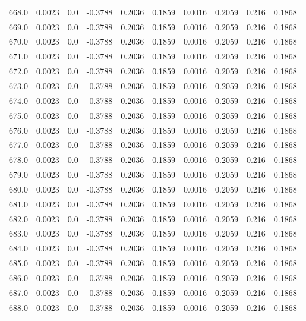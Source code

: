 \begin{longtable}{lrrrrrrrrr}
668.0 & 0.0023 & 0.0 & -0.3788 & 0.2036 & 0.1859 & 0.0016 & 0.2059 & 0.216 & 0.1868 \\
669.0 & 0.0023 & 0.0 & -0.3788 & 0.2036 & 0.1859 & 0.0016 & 0.2059 & 0.216 & 0.1868 \\
670.0 & 0.0023 & 0.0 & -0.3788 & 0.2036 & 0.1859 & 0.0016 & 0.2059 & 0.216 & 0.1868 \\
671.0 & 0.0023 & 0.0 & -0.3788 & 0.2036 & 0.1859 & 0.0016 & 0.2059 & 0.216 & 0.1868 \\
672.0 & 0.0023 & 0.0 & -0.3788 & 0.2036 & 0.1859 & 0.0016 & 0.2059 & 0.216 & 0.1868 \\
673.0 & 0.0023 & 0.0 & -0.3788 & 0.2036 & 0.1859 & 0.0016 & 0.2059 & 0.216 & 0.1868 \\
674.0 & 0.0023 & 0.0 & -0.3788 & 0.2036 & 0.1859 & 0.0016 & 0.2059 & 0.216 & 0.1868 \\
675.0 & 0.0023 & 0.0 & -0.3788 & 0.2036 & 0.1859 & 0.0016 & 0.2059 & 0.216 & 0.1868 \\
676.0 & 0.0023 & 0.0 & -0.3788 & 0.2036 & 0.1859 & 0.0016 & 0.2059 & 0.216 & 0.1868 \\
677.0 & 0.0023 & 0.0 & -0.3788 & 0.2036 & 0.1859 & 0.0016 & 0.2059 & 0.216 & 0.1868 \\
678.0 & 0.0023 & 0.0 & -0.3788 & 0.2036 & 0.1859 & 0.0016 & 0.2059 & 0.216 & 0.1868 \\
679.0 & 0.0023 & 0.0 & -0.3788 & 0.2036 & 0.1859 & 0.0016 & 0.2059 & 0.216 & 0.1868 \\
680.0 & 0.0023 & 0.0 & -0.3788 & 0.2036 & 0.1859 & 0.0016 & 0.2059 & 0.216 & 0.1868 \\
681.0 & 0.0023 & 0.0 & -0.3788 & 0.2036 & 0.1859 & 0.0016 & 0.2059 & 0.216 & 0.1868 \\
682.0 & 0.0023 & 0.0 & -0.3788 & 0.2036 & 0.1859 & 0.0016 & 0.2059 & 0.216 & 0.1868 \\
683.0 & 0.0023 & 0.0 & -0.3788 & 0.2036 & 0.1859 & 0.0016 & 0.2059 & 0.216 & 0.1868 \\
684.0 & 0.0023 & 0.0 & -0.3788 & 0.2036 & 0.1859 & 0.0016 & 0.2059 & 0.216 & 0.1868 \\
685.0 & 0.0023 & 0.0 & -0.3788 & 0.2036 & 0.1859 & 0.0016 & 0.2059 & 0.216 & 0.1868 \\
686.0 & 0.0023 & 0.0 & -0.3788 & 0.2036 & 0.1859 & 0.0016 & 0.2059 & 0.216 & 0.1868 \\
687.0 & 0.0023 & 0.0 & -0.3788 & 0.2036 & 0.1859 & 0.0016 & 0.2059 & 0.216 & 0.1868 \\
688.0 & 0.0023 & 0.0 & -0.3788 & 0.2036 & 0.1859 & 0.0016 & 0.2059 & 0.216 & 0.1868 \\

\end{longtable}
